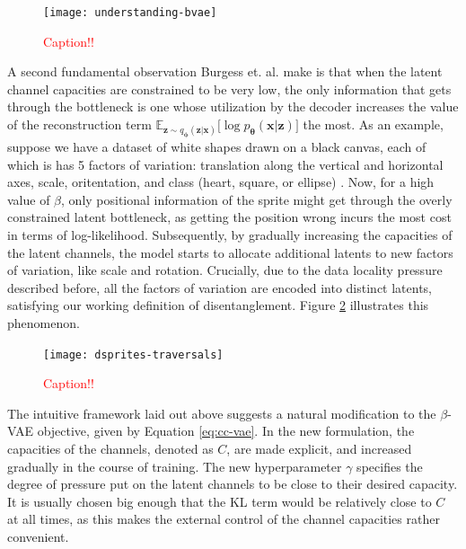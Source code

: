 \documentclass{report}
\newcommand\todo[1]{\textcolor{red}{#1}}
\begin{document}
\begin{figure}
\begin{center}
\texttt{[image: understanding-bvae]}
\caption{\todo{Caption!!}}
\label{fig:understanding-bvae}
\end{center}
\end{figure}

\noindent A second fundamental observation Burgess et. al. \cite{understanding-beta-vae} make is that when the latent channel capacities are constrained to be very low, the only information that gets through the bottleneck is one whose utilization by the decoder increases the value of the reconstruction term $\mathbb{E}_{\boldsymbol{z} \sim q_{\boldsymbol{\phi}}(\boldsymbol{z}|\boldsymbol{x})} \big[ \log p_{\boldsymbol{\theta}} (\boldsymbol{x} | \boldsymbol{z}) \big]$ the most. As an example, suppose we have a dataset of white shapes drawn on a black canvas, each of which is has 5 factors of variation: translation along the vertical and horizontal axes, scale, oritentation, and class (heart, square, or ellipse) \cite{dsprites17}. Now, for a high value of $\beta$, only positional information of the sprite might get through the overly constrained latent bottleneck, as getting the position wrong incurs the most cost in terms of log-likelihood. Subsequently, by gradually increasing the capacities of the latent channels, the model starts to allocate additional latents to new factors of variation, like scale and rotation. Crucially, due to the data locality pressure described before, all the factors of variation are encoded into distinct latents, satisfying our working definition of disentanglement. Figure \ref{fig:dsprites-trav} illustrates this phenomenon. \\

\begin{figure}
\begin{center}
\texttt{[image: dsprites-traversals]}
\caption{\todo{Caption!!}}
\label{fig:dsprites-trav}
\end{center}
\end{figure}

\noindent The intuitive framework laid out above suggests a natural modification to the $\beta$-VAE objective, given by Equation \ref{eq:cc-vae}. In the new formulation, the capacities of the channels, denoted as $C$, are made explicit, and increased gradually in the course of training. The new hyperparameter $\gamma$ specifies the degree of pressure put on the latent channels to be close to their desired capacity. It is usually chosen big enough that the KL term would be relatively close to $C$ at all times, as this makes the external control of the channel capacities rather convenient. \\
\end{document}
